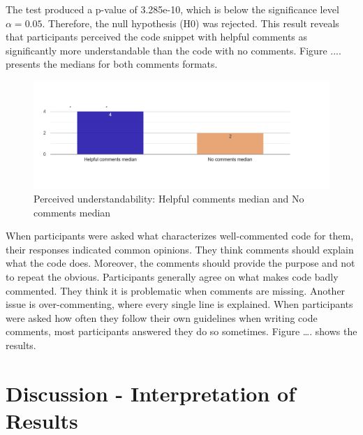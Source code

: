 The test produced a p-value of 3.285e-10, which is below the significance level $\alpha = 0.05$. Therefore, the null hypothesis (H0) was rejected. This result reveals that participants perceived the code snippet with helpful comments as significantly more understandable than the code with no comments. Figure .... presents the medians for both comments formats.

\begin{figure} [H]
  \centering
  \includegraphics[scale=0.4]{figures/h-0-q4.png}
  \caption{ Perceived understandability: Helpful comments median and No comments median}
  \label{fig:AnhangsChor}
\end{figure}








When participants were asked what characterizes well-commented code for them, their responses indicated common opinions. They think comments should explain what the code does. Moreover, the comments should provide the purpose and not to repeat the obvious. Participants generally agree on what makes code badly commented. They think it is problematic when comments are missing. Another issue is over-commenting, where every single line is explained.
When participants were asked how often they follow their own guidelines when writing code comments, most participants answered they do so sometimes. Figure …. shows the results.



\chapter{Discussion - Interpretation of Results}

